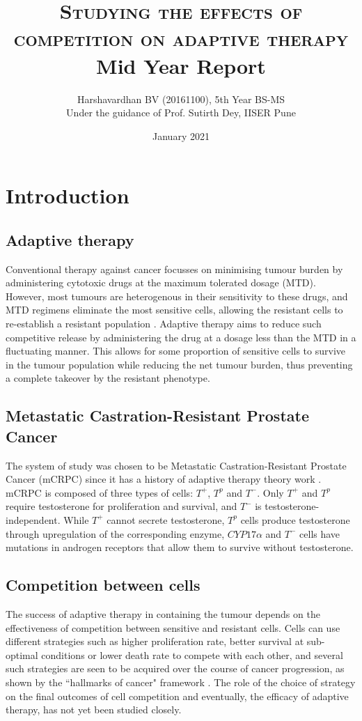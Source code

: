 \documentclass[11pt,a4paper]{article}
\title{\textsc{Studying the effects of competition on adaptive therapy}\\\Large{Mid Year Report}}
\author{Harshavardhan BV (20161100), 5th Year BS-MS\\
Under the guidance of Prof. Sutirth Dey, IISER Pune}
\date{January 2021}
\begin{document}
\maketitle

\section{Introduction}
\subsection{Adaptive therapy}
Conventional therapy against cancer focusses on minimising tumour burden by administering cytotoxic drugs at the maximum tolerated dosage (MTD). However, most tumours are heterogenous in their sensitivity to these drugs, and MTD regimens eliminate the most sensitive cells, allowing the resistant cells to re-establish a resistant population \cite{Scott}. Adaptive therapy aims to reduce such competitive release by administering the drug at a dosage less than the MTD in a fluctuating manner. This allows for some proportion of sensitive cells to survive in the tumour population while reducing the net tumour burden, thus preventing a complete takeover by the resistant phenotype.

\subsection{Metastatic Castration-Resistant Prostate Cancer}
The system of study was chosen to be Metastatic Castration-Resistant Prostate Cancer (mCRPC) since it has a history of adaptive therapy theory work \cite{Cunningham}. mCRPC is composed of three types of cells: $T^+$, $T^p$ and $T^-$. Only $T^+$ and $T^p$ require testosterone for proliferation and survival, and $T^-$ is testosterone-independent. While $T^+$ cannot secrete testosterone, $T^p$ cells produce testosterone through upregulation of the corresponding enzyme, $CYP17\alpha$ and $T^-$ cells have mutations in androgen receptors that allow them to survive without testosterone.

\subsection{Competition between cells}
The success of adaptive therapy in containing the tumour depends on the effectiveness of competition between sensitive and resistant cells. Cells can use different strategies such as higher proliferation rate, better survival at sub-optimal conditions or lower death rate to compete with each other, and several such strategies are seen to be acquired over the course of cancer progression, as shown by the ``hallmarks of cancer" framework \cite{Hanahan}. The role of the choice of strategy on the final outcomes of cell competition and eventually, the efficacy of adaptive therapy, has not yet been studied closely.
\end{document}
